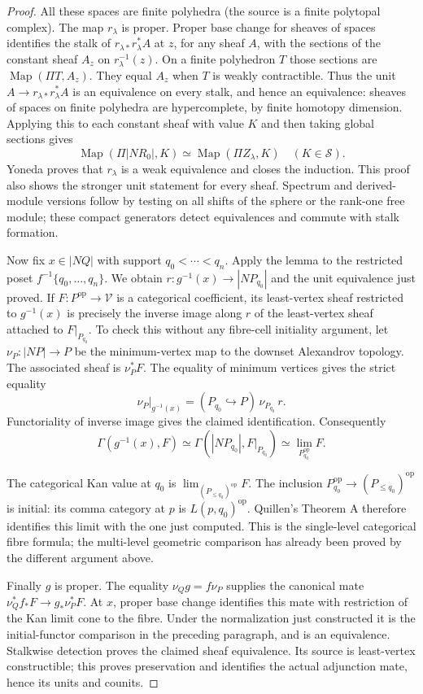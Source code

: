 \begin{proof}
All these spaces are finite polyhedra (the source is a finite
polytopal complex). The map $r_\lambda$ is proper. Proper base
change for sheaves of spaces \citep[Corollary 7.3.1.18]{GHIJLurie2009} identifies the stalk of
$r_{\lambda *}r_\lambda^*A$ at $z$, for any sheaf $A$, with the
sections of the constant sheaf $A_z$ on $r_\lambda^{-1}(z)$.
On a finite polyhedron $T$ those sections are
$\operatorname{Map}(\Pi T,A_z)$. They equal $A_z$ when $T$ is
weakly contractible. Thus the unit
$A\to r_{\lambda *}r_\lambda^*A$ is an equivalence on every
stalk, and hence an equivalence: sheaves of spaces on finite
polyhedra are hypercomplete, by finite homotopy dimension.
Applying this to each constant sheaf with value $K$ and then taking
global sections gives
\[
 \operatorname{Map}(\Pi|NR_0|,K)
   \simeq\operatorname{Map}(\Pi Z_\lambda,K)
 \quad(K\in\mathcal S).
\]
Yoneda proves that $r_\lambda$ is a weak equivalence and closes
the induction. This proof also shows the stronger unit statement
for every sheaf. Spectrum and derived-module versions follow by
testing on all shifts of the sphere or the rank-one free module;
these compact generators detect equivalences and commute with
stalk formation.

Now fix $x\in|NQ|$ with support $q_0<\cdots<q_n$. Apply the lemma
to the restricted poset $f^{-1}\{q_0,\ldots,q_n\}$. We obtain
$r:g^{-1}(x)\to|NP_{q_0}|$ and the unit equivalence just proved.
If $F:P^{\mathrm{op}}\to\mathcal V$ is a categorical coefficient,
its least-vertex sheaf restricted to $g^{-1}(x)$ is precisely the
inverse image along $r$ of the least-vertex sheaf attached to
$F|_{P_{q_0}}$. To check this without any fibre-cell initiality
argument, let $\nu_P:|NP|\to P$ be the minimum-vertex map to the
downset Alexandrov topology. The associated sheaf is $\nu_P^*F$.
The equality of minimum vertices gives the strict equality
\[
 \nu_P|_{g^{-1}(x)}
   = (P_{q_0}\hookrightarrow P)\,\nu_{P_{q_0}}\,r.
\]
Functoriality of inverse image gives the claimed identification.
Consequently
\[
 \Gamma(g^{-1}(x),F)
   \simeq \Gamma(|NP_{q_0}|,F|_{P_{q_0}})
   \simeq\lim_{P_{q_0}^{\mathrm{op}}}F.
\]

The categorical Kan value at $q_0$ is
$\lim_{(P_{\leq q_0})^{\mathrm{op}}}F$. The inclusion
$P_{q_0}^{\mathrm{op}}\to(P_{\leq q_0})^{\mathrm{op}}$ is initial:
its comma category at $p$ is $L(p,q_0)^{\mathrm{op}}$.
Quillen's Theorem A therefore identifies this limit with the one
just computed. This is the single-level categorical fibre formula;
the multi-level geometric comparison has already been proved by
the different argument above.

Finally $g$ is proper. The equality $\nu_Qg=f\nu_P$ supplies the
canonical mate $\nu_Q^*f_*F\to g_*\nu_P^*F$. At $x$, proper base
change identifies this mate with restriction of the Kan limit cone
to the fibre. Under the normalization just constructed it is the
initial-functor comparison in the preceding paragraph, and is an
equivalence. Stalkwise detection proves the claimed sheaf
equivalence. Its source is least-vertex constructible; this proves
preservation and identifies the actual adjunction mate, hence its
units and counits.
\end{proof}

